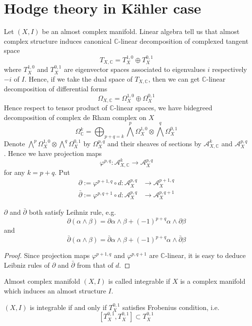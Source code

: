 \documentclass[oneside,a4paper]{amsart}
\begin{document}
\section{Hodge theory in K\"ahler case}
Let $(X,I)$ be an almost complex manifold. Linear algebra tell us that almost complex structure induces canonical $\mathbb{C}$-linear decomposition of complexed tangent space
\[
T_{X,\mathbb{C}}= T_{X}^{1,0} \oplus T_X^{0,1}
\]
where $T_X^{1,0}$ and $T_X^{0,1}$ are eigenvector spaces associated to eigenvalues $i$ respectively $-i$ of $I$. Hence, if we take the dual space of $T_{X,\mathbb{C}}$, then we can get $\mathbb{C}$-linear decomposition of differential forms
\[
\Omega_{X,\mathbb{C}} = \Omega_X^{1,0} \oplus \Omega_X^{0,1}
\]
Hence respect to tensor product of $\mathbb{C}$-linear spaces, we have bidegreed decomposition of complex de Rham complex on $X$
\[
\Omega^k_{\mathbb{C}} = \bigoplus_{p+q=k}\bigwedge^p \Omega_X^{1,0} \otimes \bigwedge^q \Omega_X^{0,1}
\]
Denote $\bigwedge^p \Omega_X^{1,0} \otimes \bigwedge^q \Omega_X^{0,1}$ by $\Omega^{p,q}_X$ and their sheaves of sections by $\mathcal{A}^k_{X,\mathbb{C}}$ and $\mathcal{A}^{p,q}_{X}$. Hence we have projection maps
\[
\varphi^{p,q}: \mathcal{A}^{k}_{X,\mathbb{C}} \rightarrow \mathcal{A}^{p,q}_X
\]
for any $k= p+q$. Put 
\[
\begin{aligned}
\partial:= \varphi^{p+1,q} \circ d : \mathcal{A}^{p,q}_{X} &\rightarrow \mathcal{A}^{p+1,q}_{X}  \\
\bar{\partial}:= \varphi^{p,q+1} \circ d: \mathcal{A}^{p,q}_X &\rightarrow \mathcal{A}^{p,q+1}_X
\end{aligned}
\]
\begin{seclemma}
	$\partial$ and $\bar{\partial}$ both satisfy Leihniz rule, e.g.
	\[
	\partial(\alpha \wedge \beta) = \partial{\alpha} \wedge \beta +(-1)^{p+q} \alpha \wedge \partial{\beta}
	\]
	and
	\[
	\bar{\partial}(\alpha \wedge \beta) = \bar{\partial}\alpha \wedge \beta + (-1)^{p+q}\alpha \wedge \bar{\partial} \beta
	\]
\end{seclemma}
\begin{proof}
	Since projection maps $\varphi^{p+1,q}$ and $\varphi^{p,q+1}$ are $\mathbb{C}$-linear, it is easy to deduce Leibniz rules of $\partial$ and $\bar{\partial}$ from that of $d$.
\end{proof}
\begin{secdefn}
	Almost complex manifold $(X,I)$ is called integrable if $X$ is a complex manifold which induces an almost structure $I$.
\end{secdefn}
\begin{secthm}
	$(X,I)$ is integrable if and only if $T_X^{0,1}$ satisfies Frobenius condition, i.e.
	\[
	[T_X^{0,1}, T_X^{0,1}] \subset T_X^{0,1}
	\]
\end{secthm}
\end{document}
